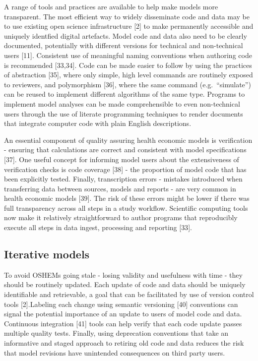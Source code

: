 \documentclass[
]{article}
\begin{document}
A range of tools and practices are available to help make models more transparent. The most efficient way to widely disseminate code and data may be to use existing open science infrastructure {[}2{]} to make permanently accessible and uniquely identfied digital artefacts. Model code and data also need to be clearly documented, potentially with different versions for technical and non-technical users {[}11{]}. Consistent use of meaningful naming conventions when authoring code is recommended {[}33,34{]}. Code can be made easier to follow by using the practices of abstraction {[}35{]}, where only simple, high level commands are routinely exposed to reviewers, and polymorphism {[}36{]}, where the same command (e.g.~``simulate'') can be reused to implement different algorithms of the same type. Programs to implement model analyses can be made comprehensible to even non-technical users through the use of literate programming techniques to render documents that integrate computer code with plain English descriptions.

An essential component of quality assuring health economic models is verification - ensuring that calculations are correct and consistent with model specifications {[}37{]}. One useful concept for informing model users about the extensiveness of verification checks is code coverage {[}38{]} - the proportion of model code that has been explicitly tested. Finally, transcription errors - mistakes introduced when transferring data between sources, models and reports - are very common in health economic models {[}39{]}. The risk of these errors might be lower if there was full transparency across all steps in a study workflow. Scientific computing tools now make it relatively straightforward to author programs that reproducibly execute all steps in data ingest, processing and reporting {[}33{]}.

\hypertarget{iterative-models}{%
\subsection{Iterative models}\label{iterative-models}}

To avoid OSHEMs going stale - losing validity and usefulness with time - they should be routinely updated. Each update of code and data should be uniquely identifiable and retrievable, a goal that can be facilitated by use of version control tools {[}2{]}.Labeling each change using semantic versioning {[}40{]} conventions can signal the potential importance of an update to users of model code and data. Continuous integration {[}41{]} tools can help verify that each code update passes multiple quality tests.
Finally, using deprecation conventions that take an informative and staged approach to retiring old code and data reduces the risk that model revisions have unintended consequences on third party users.\\
\end{document}
